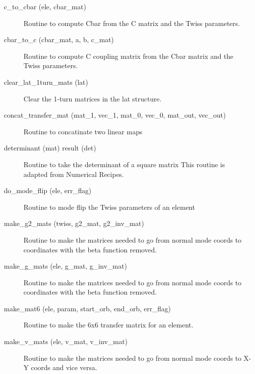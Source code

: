 \begin{description}

\label{r:c.to.cbar}
\item[c_to_cbar (ele, cbar_mat)] \Newline
Routine to compute Cbar from the C matrix and the Twiss parameters. 

\label{r:cbar.to.c}
\item[cbar_to_c (cbar_mat, a, b, c_mat)] \Newline
Routine to compute C coupling matrix from the Cbar matrix and the Twiss parameters. 

\label{r:clear.lat.1turn.mats}
\item[clear_lat_1turn_mats (lat)] \Newline
Clear the 1-turn matrices in the lat structure. 

\label{r:concat.transfer.mat}
\item[concat_transfer_mat (mat_1, vec_1, mat_0, vec_0, mat_out, vec_out)] \Newline 
Routine to concatinate two linear maps

\label{r:determinant}
\item[determinant (mat) result (det)] \Newline 
Routine to take the determinant of a square matrix
This routine is adapted from Numerical Recipes.

\label{r:do.mode.flip}
\item[do_mode_flip (ele, err_flag)] \Newline
Routine to mode flip the Twiss parameters of an element 

\label{r:make.g2.mats}
\item[make_g2_mats (twiss, g2_mat, g2_inv_mat)] \Newline
Routine to make the matrices needed to go from normal mode coords to 
coordinates with the beta function removed. 

\label{r:make.g.mats}
\item[make_g_mats (ele, g_mat, g_inv_mat)] \Newline
Routine to make the matrices needed to go from normal mode coords to 
coordinates with the beta function removed. 

\label{r:make.mat6}
\item[make_mat6 (ele, param, start_orb, end_orb, err_flag)] \Newline
Routine to make the 6x6 transfer matrix for an element. 

\label{r:make.v.mats}
\item[make_v_mats (ele, v_mat, v_inv_mat)] \Newline
Routine to make the matrices needed to go from normal mode coords to X-Y 
coords and vice versa. 


\end{description}
